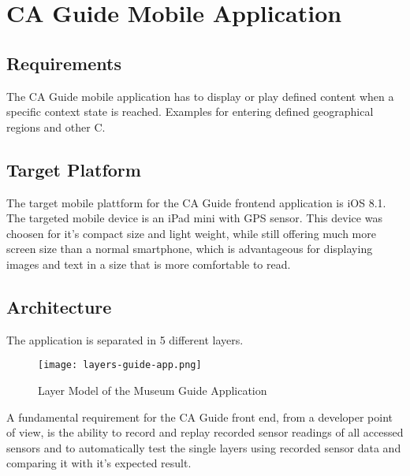 
\chapter{CA Guide Mobile Application} %

\label{frontend} %



\section{Requirements}

The CA Guide mobile application has to display or play defined content when a specific context state is reached. Examples for entering defined geographical regions and other C. 

\section{Target Platform}

The target mobile plattform for the CA Guide frontend application is iOS 8.1. The targeted mobile device is an iPad mini with GPS sensor. This device was choosen for it's compact size and light weight, while still offering much more screen size than a normal smartphone, which is advantageous for displaying images and text in a size that is more comfortable to read.

\section{Architecture}

The application is separated in 5 different layers.

\begin{figure}[H]
\centering
\texttt{[image: layers-guide-app.png]}
\caption{Layer Model of the Museum Guide Application}
\end{figure}

A fundamental requirement for the CA Guide front end, from a developer point of view, is the ability to record and replay recorded sensor readings of all accessed sensors and to automatically test the single layers using recorded sensor data and comparing it with it's expected result.

